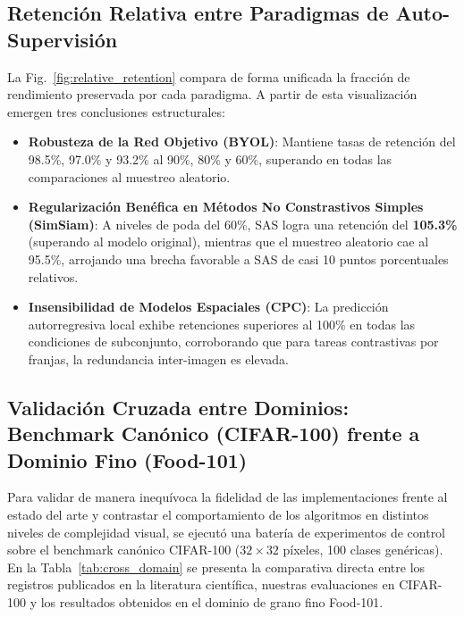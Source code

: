 \subsection{Retención Relativa entre Paradigmas de Auto-Supervisión}
La Fig.~\ref{fig:relative_retention} compara de forma unificada la fracción de rendimiento preservada por cada paradigma. A partir de esta visualización emergen tres conclusiones estructurales:
\begin{itemize}
    \item \textbf{Robusteza de la Red Objetivo (BYOL)}: Mantiene tasas de retención del 98.5\%, 97.0\% y 93.2\% al 90\%, 80\% y 60\%, superando en todas las comparaciones al muestreo aleatorio.
    \item \textbf{Regularización Benéfica en Métodos No Constrastivos Simples (SimSiam)}: A niveles de poda del 60\%, SAS logra una retención del \textbf{105.3\%} (superando al modelo original), mientras que el muestreo aleatorio cae al 95.5\%, arrojando una brecha favorable a SAS de casi 10 puntos porcentuales relativos.
    \item \textbf{Insensibilidad de Modelos Espaciales (CPC)}: La predicción autorregresiva local exhibe retenciones superiores al 100\% en todas las condiciones de subconjunto, corroborando que para tareas contrastivas por franjas, la redundancia inter-imagen es elevada.
\end{itemize}

\subsection{Validación Cruzada entre Dominios: Benchmark Canónico (CIFAR-100) frente a Dominio Fino (Food-101)}
\label{subsec:cross_domain}

Para validar de manera inequívoca la fidelidad de las implementaciones frente al estado del arte y contrastar el comportamiento de los algoritmos en distintos niveles de complejidad visual, se ejecutó una batería de experimentos de control sobre el benchmark canónico CIFAR-100 ($32 \times 32$ píxeles, 100 clases genéricas). En la Tabla~\ref{tab:cross_domain} se presenta la comparativa directa entre los registros publicados en la literatura científica, nuestras evaluaciones en CIFAR-100 y los resultados obtenidos en el dominio de grano fino Food-101.


